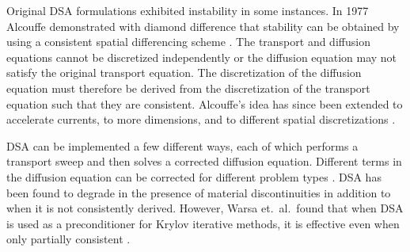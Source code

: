 
Original DSA formulations exhibited instability in some instances. In 1977 Alcouffe demonstrated with diamond difference that stability can be obtained by using a consistent spatial differencing scheme \cite{Alcouffe1977}. The transport and diffusion equations cannot be discretized independently or the diffusion equation may not satisfy the original transport equation. The discretization of the diffusion equation must therefore be derived from the discretization of the transport equation such that they are consistent. Alcouffe's idea has since been extended to accelerate currents, to more dimensions, and to different spatial discretizations \cite{Larsen1982}. 

DSA can be implemented a few different ways, each of which performs a transport sweep and then solves a corrected diffusion equation. Different terms in the diffusion equation can be corrected for different problem types \cite{Alcouffe1977}. DSA has been found to degrade in the presence of material discontinuities in addition to when it is not consistently derived. However, Warsa et.\ al.\ found that when DSA is used as a preconditioner for Krylov iterative methods, it is effective even when only partially consistent \cite{Warsa2004}.

